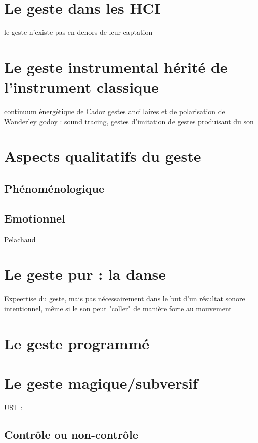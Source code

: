 \section{Le geste dans les HCI}
	le geste n'existe pas en dehors de leur captation  

\section{Le geste instrumental hérité de l'instrument classique}
	continuum énergétique de Cadoz
	gestes ancillaires et de polarisation de Wanderley
	godoy : sound tracing, gestes d'imitation de gestes produisant du son

\section{Aspects qualitatifs du geste}
	\subsection{Phénoménologique}
	\subsection{Emotionnel}

Pelachaud 

\section{Le geste pur : la danse}
Expeertise du geste, mais pas nécessairement dans le but d'un résultat sonore intentionnel, même si le son peut "coller" de manière forte au mouvement


\section{Le geste programmé}


\section{Le geste magique/subversif}

\cite{cadoz_synthese_1981}

\cite{gibet_codage_1987}

\cite{cadoz_instrumental_1988}

\cite{delalande_geste_1988}

UST : \cite{delalande_les_1996}


\subsection{Contrôle ou non-contrôle}

